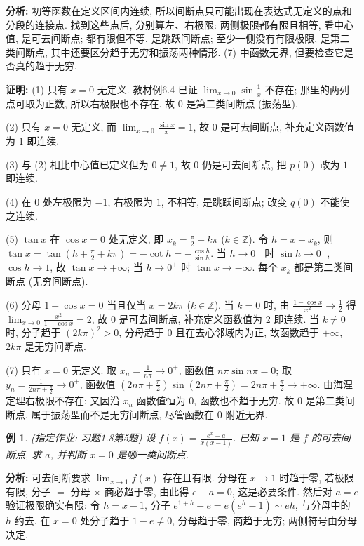 \documentclass[UTF8,openany]{ctexbook}
\theoremstyle{chinesetextbook}
\newtheorem{example}{例}[section]
\newenvironment{cnproof}{\par\indent\textbf{证明:} \ignorespaces}{\par}
\begin{document}
\par\indent\textbf{分析:} 初等函数在定义区间内连续, 所以间断点只可能出现在表达式无定义的点和分段的连接点. 找到这些点后, 分别算左、右极限: 两侧极限都有限且相等, 看中心值, 是可去间断点; 都有限但不等, 是跳跃间断点; 至少一侧没有有限极限, 是第二类间断点, 其中还要区分趋于无穷和振荡两种情形. (7) 中函数无界, 但要检查它是否真的趋于无穷.
\begin{cnproof}
(1) 只有 $x=0$ 无定义. 教材例6.4 已证 $\displaystyle\lim_{x\to0}\sin\frac1x$ 不存在; 那里的两列点可取为正数, 所以右极限也不存在. 故 $0$ 是第二类间断点 (振荡型).

(2) 只有 $x=0$ 无定义, 而 $\displaystyle\lim_{x\to0}\frac{\sin x}x=1$, 故 $0$ 是可去间断点, 补充定义函数值为 $1$ 即连续.

(3) 与 (2) 相比中心值已定义但为 $0\ne1$, 故 $0$ 仍是可去间断点, 把 $p(0)$ 改为 $1$ 即连续.

(4) 在 $0$ 处左极限为 $-1$, 右极限为 $1$, 不相等, 是跳跃间断点; 改变 $q(0)$ 不能使之连续.

(5) $\tan x$ 在 $\cos x=0$ 处无定义, 即 $\displaystyle x_k=\frac\pi2+k\pi$ ($k\in\mathbb Z$). 令 $h=x-x_k$, 则 $\displaystyle\tan x=\tan\left(h+\frac\pi2+k\pi\right)=-\cot h=-\frac{\cos h}{\sin h}$. 当 $h\to0^-$ 时 $\sin h\to0^-$, $\cos h\to1$, 故 $\tan x\to+\infty$; 当 $h\to0^+$ 时 $\tan x\to-\infty$. 每个 $x_k$ 都是第二类间断点 (无穷间断点).

(6) 分母 $1-\cos x=0$ 当且仅当 $x=2k\pi$ ($k\in\mathbb Z$). 当 $k=0$ 时, 由 $\displaystyle\frac{1-\cos x}{x^2}\to\frac12$ 得 $\displaystyle\lim_{x\to0}\frac{x^2}{1-\cos x}=2$, 故 $0$ 是可去间断点, 补充定义函数值为 $2$ 即连续. 当 $k\ne0$ 时, 分子趋于 $(2k\pi)^2>0$, 分母趋于 $0$ 且在去心邻域内为正, 故函数趋于 $+\infty$, $2k\pi$ 是无穷间断点.

(7) 只有 $x=0$ 无定义. 取 $\displaystyle x_n=\frac1{n\pi}\to0^+$, 函数值 $n\pi\sin n\pi=0$; 取 $\displaystyle y_n=\frac1{2n\pi+\frac\pi2}\to0^+$, 函数值 $\displaystyle\left(2n\pi+\frac\pi2\right)\sin\left(2n\pi+\frac\pi2\right)=2n\pi+\frac\pi2\to+\infty$. 由海涅定理右极限不存在; 又因沿 $x_n$ 函数值恒为 $0$, 函数也不趋于无穷. 故 $0$ 是第二类间断点, 属于振荡型而不是无穷间断点, 尽管函数在 $0$ 附近无界.
\end{cnproof}
\begin{example}
\textnormal{(指定作业: 习题1.8第5题)} 设 $\displaystyle f(x)=\frac{e^x-a}{x(x-1)}$. 已知 $x=1$ 是 $f$ 的可去间断点, 求 $a$, 并判断 $x=0$ 是哪一类间断点.
\end{example}
\par\indent\textbf{分析:} 可去间断要求 $\displaystyle\lim_{x\to1}f(x)$ 存在且有限. 分母在 $x\to1$ 时趋于零, 若极限有限, 分子 $=$ 分母 $\times$ 商必趋于零, 由此得 $e-a=0$, 这是必要条件. 然后对 $a=e$ 验证极限确实有限: 令 $h=x-1$, 分子 $e^{1+h}-e=e(e^h-1)\sim eh$, 与分母中的 $h$ 约去. 在 $x=0$ 处分子趋于 $1-e\ne0$, 分母趋于零, 商趋于无穷; 两侧符号由分母决定.
\end{document}
